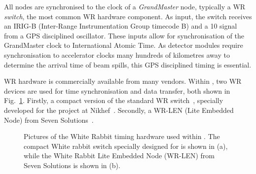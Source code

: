 All nodes are synchronised to the clock of a \emph{GrandMaster} node, typically a WR
\emph{switch}, the most common WR hardware component. As input, the switch receives an IRIG-B
(Inter-Range Instrumentation Group timecode B) and a \unit{10}{} signal from a GPS
disciplined oscillator. These inputs allow for synchronisation of the GrandMaster clock to
International Atomic Time. As \chips detector modules require synchronisation to accelerator
clocks many hundreds of kilometres away to determine the arrival time of beam spills, this GPS
disciplined timing is essential.

WR hardware is commercially available from many vendors. Within \chipsfive, two WR devices are
used for time synchronisation and data transfer, both shown in Fig.~\ref{fig:wr_electronics}.
Firstly, a compact version of the standard WR switch~\cite{wrswitch2020}, specially developed for
the \chips project at Nikhef~\cite{wrchromium2020}. Secondly, a WR-LEN (Lite Embedded Node) from
Seven Solutions~\cite{wrlen2020}. 

\begin{figure} %
    \centering
    \quad
    \caption[Pictures of the White Rabbit timing hardware used within \chipsfive]
    {Pictures of the White Rabbit timing hardware used within \chipsfive. The compact White rabbit
        switch  specially designed for \chips is shown in (a), while the White Rabbit Lite
        Embedded Node (WR-LEN) from Seven Solutions is shown in (b).}
    \label{fig:wr_electronics}
\end{figure}

